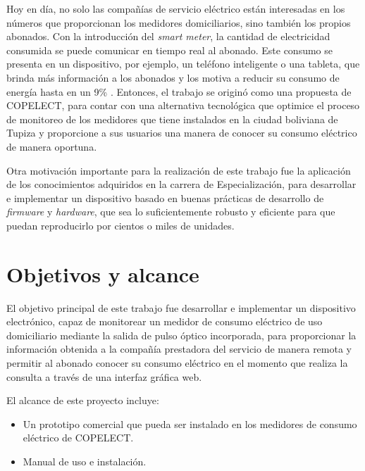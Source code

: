 Hoy en día, no solo las compañías de servicio eléctrico están interesadas en los números que proporcionan los medidores domiciliarios, sino también los propios abonados. Con la introducción del \textit{smart meter}, la cantidad de electricidad consumida se puede comunicar en tiempo real al abonado. Este consumo se presenta en un dispositivo, por ejemplo, un teléfono inteligente o una tableta, que brinda más información a los abonados y los motiva a reducir su consumo de energía hasta en un 9\% \citep{WEBSITE:8}. Entonces, el trabajo se originó como una propuesta de COPELECT, para contar con una alternativa tecnológica que optimice el proceso de monitoreo de los medidores que tiene instalados en la ciudad boliviana de Tupiza y proporcione a sus usuarios una manera de conocer su consumo eléctrico de manera oportuna.

Otra motivación importante para la realización de este trabajo fue la aplicación de los conocimientos adquiridos en la carrera de Especialización, para desarrollar e implementar un dispositivo basado en buenas prácticas de desarrollo de \textit{firmware} y \textit{hardware}, que sea lo suficientemente robusto y eficiente para que puedan reproducirlo por cientos o miles de unidades.


\section{Objetivos y alcance}

El objetivo principal de este trabajo fue desarrollar e implementar un dispositivo electrónico, capaz de monitorear un medidor de consumo eléctrico de uso domiciliario mediante la salida de pulso óptico incorporada, para proporcionar la información obtenida a la compañía prestadora del servicio de manera remota y permitir al abonado conocer su consumo eléctrico en el momento que realiza la consulta a través de una interfaz gráfica web.

El alcance de este proyecto incluye:

\begin{itemize}
	\item Un prototipo comercial que pueda ser instalado en los medidores de consumo eléctrico de COPELECT.
	\item Manual de uso e instalación.
\end{itemize}